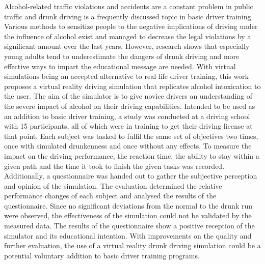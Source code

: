 Alcohol-related traffic violations and accidents are a constant problem in public traffic and drunk driving is a frequently discussed topic in basic driver training.
Various methods to sensitize people to the negative implications of driving under the influence of alcohol exist and managed to decrease the legal violations by a significant amount over the last years.
However, research shows that especially young adults tend to underestimate the dangers of drunk driving and more effective ways to impart the educational message are needed.
With virtual simulations being an accepted alternative to real-life driver training, this work proposes a virtual reality driving simulation that replicates alcohol intoxication to the user.
The aim of the simulator is to give novice drivers an understanding of the severe impact of alcohol on their driving capabilities.
Intended to be used as an addition to basic driver training, a study was conducted at a driving school with 15 participants, all of which were in training to get their driving license at that point.
Each subject was tasked to fulfil the same set of objectives two times, once with simulated drunkenness and once without any effects.
To measure the impact on the driving performance, the reaction time, the ability to stay within a given path and the time it took to finish the given tasks was recorded.
Additionally, a questionnaire was handed out to gather the subjective perception and opinion of the simulation.
The evaluation determined the relative performance changes of each subject and analysed the results of the questionnaire.
Since no significant deviations from the normal to the drunk run were observed, the effectiveness of the simulation could not be validated by the measured data.
The results of the questionnaire show a positive reception of the simulator and its educational intention.
With improvements on the quality and further evaluation, the use of a virtual reality drunk driving simulation could be a potential voluntary addition to basic driver training programs.
